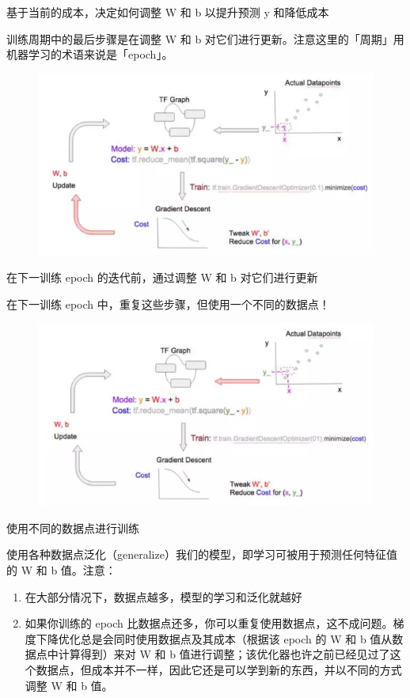 \documentclass[11pt]{book} %
\begin{document}
基于当前的成本，决定如何调整 W 和 b 以提升预测 y 和降低成本

训练周期中的最后步骤是在调整 W 和 b 对它们进行更新。注意这里的「周期」用机器学习的术语来说是「epoch」。

\begin{figure}
\centering
\includegraphics[width=0.7\linewidth]{figures/epoch}
\caption{}
\label{fig:epoch}
\end{figure}


在下一训练 epoch 的迭代前，通过调整 W 和 b 对它们进行更新

在下一训练 epoch 中，重复这些步骤，但使用一个不同的数据点！

\begin{figure}
\centering
\includegraphics[width=0.7\linewidth]{figures/epoch_iter}
\caption{}
\label{fig:epochiter}
\end{figure}


使用不同的数据点进行训练

使用各种数据点泛化（generalize）我们的模型，即学习可被用于预测任何特征值的 W 和 b 值。注意：
\begin{enumerate}
    \item 在大部分情况下，数据点越多，模型的学习和泛化就越好
    \item 如果你训练的 epoch 比数据点还多，你可以重复使用数据点，这不成问题。梯度下降优化总是会同时使用数据点及其成本（根据该 epoch 的 W 和 b 值从数据点中计算得到）来对 W 和 b 值进行调整；该优化器也许之前已经见过了这个数据点，但成本并不一样，因此它还是可以学到新的东西，并以不同的方式调整 W 和 b 值。
\end{enumerate}
\end{document}
